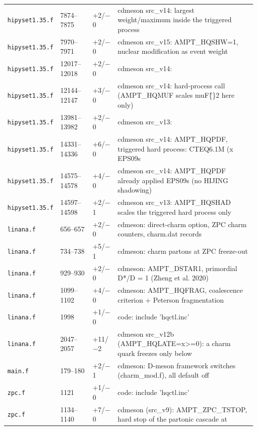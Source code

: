 {\begin{longtable}{@{}p{2.7cm}p{1.5cm}p{1.3cm}p{9.4cm}@{}}
\texttt{hipyset1.35.f} & 7874--7875 & +2/$-$0 & cdmeson src\_\allowbreak{}v14: largest weight/maximum inside the triggered process \\
\texttt{hipyset1.35.f} & 7970--7971 & +2/$-$0 & cdmeson src\_\allowbreak{}v15: AMPT\_\allowbreak{}HQSHW=1, nuclear modification as event weight \\
\texttt{hipyset1.35.f} & 12017--12018 & +2/$-$0 & cdmeson src\_\allowbreak{}v14: \\
\texttt{hipyset1.35.f} & 12144--12147 & +3/$-$0 & cdmeson src\_\allowbreak{}v14: hard-process call (AMPT\_\allowbreak{}HQMUF scales muF\^\{\}2 here only) \\
\texttt{hipyset1.35.f} & 13981--13982 & +2/$-$0 & cdmeson src\_\allowbreak{}v13: \\
\texttt{hipyset1.35.f} & 14331--14336 & +6/$-$0 & cdmeson src\_\allowbreak{}v14: AMPT\_\allowbreak{}HQPDF, triggered hard process: CTEQ6.1M (x EPS09s \\
\texttt{hipyset1.35.f} & 14575--14578 & +4/$-$0 & cdmeson src\_\allowbreak{}v14: AMPT\_\allowbreak{}HQPDF already applied EPS09s (no HIJING shadowing) \\
\texttt{hipyset1.35.f} & 14597--14598 & +2/$-$1 & cdmeson src\_\allowbreak{}v13: AMPT\_\allowbreak{}HQSHAD scales the triggered hard process only \\
\texttt{linana.f} & 656--657 & +2/$-$0 & cdmeson: direct-charm option, ZPC charm counters, charm.dat records \\
\texttt{linana.f} & 734--738 & +5/$-$1 & cdmeson: charm partons at ZPC freeze-out \\
\texttt{linana.f} & 929--930 & +2/$-$0 & cdmeson: AMPT\_\allowbreak{}DSTAR1, primordial D*/D = 1 (Zheng et al. 2020) \\
\texttt{linana.f} & 1099--1102 & +4/$-$0 & cdmeson: AMPT\_\allowbreak{}HQFRAG, coalescence criterion + Peterson fragmentation \\
\texttt{linana.f} & 1998 & +1/$-$0 & code: include 'hqctl.inc' \\
\texttt{linana.f} & 2047--2057 & +11/$-$2 & cdmeson src\_\allowbreak{}v12b (AMPT\_\allowbreak{}HQLATE=x>=0): a charm quark freezes only below \\
\texttt{main.f} & 179--180 & +2/$-$1 & cdmeson: D-meson framework switches (charm\_\allowbreak{}mod.f), all default off \\
\texttt{zpc.f} & 1121 & +1/$-$0 & code: include 'hqctl.inc' \\
\texttt{zpc.f} & 1134--1140 & +7/$-$0 & cdmeson (src\_\allowbreak{}v9): AMPT\_\allowbreak{}ZPC\_\allowbreak{}TSTOP, hard stop of the partonic cascade at \\

\end{longtable}}
